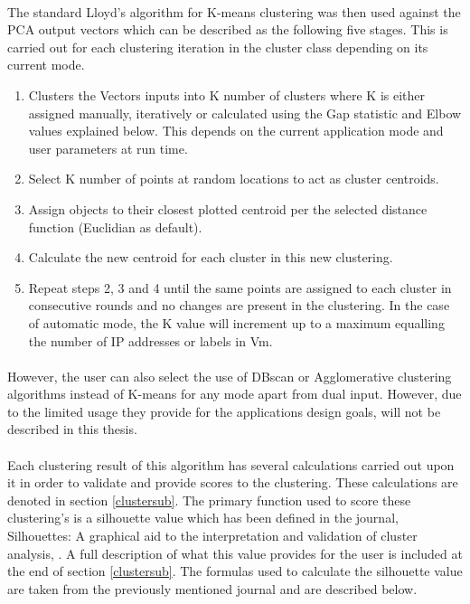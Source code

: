 \paragraph{}The standard Lloyd’s algorithm for K-means clustering was then used against the PCA output vectors which can be described as the following five stages. This is carried out for each clustering iteration in the cluster class depending on its current mode.

\begin{enumerate}
\item Clusters the Vectors inputs into K number of clusters where K is either assigned manually, iteratively or calculated using the Gap statistic and Elbow values explained below. This depends on the current application mode and user parameters at run time.
\item  Select K number of points at random locations to act as cluster centroids.
\item  Assign objects to their closest plotted centroid per the selected distance function (Euclidian as default).
\item Calculate the new centroid for each cluster in this new clustering.
\item Repeat steps 2, 3 and 4 until the same points are assigned to each cluster in consecutive rounds and no changes are present in the clustering. In the case of automatic mode, the K value will increment up to a maximum equalling the number of IP addresses or labels in Vm.
\end{enumerate}

\paragraph{}However, the user can also select the use of DBscan or Agglomerative clustering algorithms instead of K-means for any mode apart from dual input. However, due to the limited usage they provide for the applications design goals, will not be described in this thesis. 

\paragraph{}Each clustering result of this algorithm has several calculations carried out upon it in order to validate and provide scores to the clustering. These calculations are denoted in section \ref{clustersub}. The primary function used to score these clustering’s is a silhouette value which has been defined in the journal, Silhouettes: A graphical aid to the interpretation and validation of cluster analysis, \cite{silhouette}. A full description of what this value provides for the user is included at the end of section \ref{clustersub}. The formulas used to calculate the silhouette value are taken from the previously mentioned journal and are described below.

